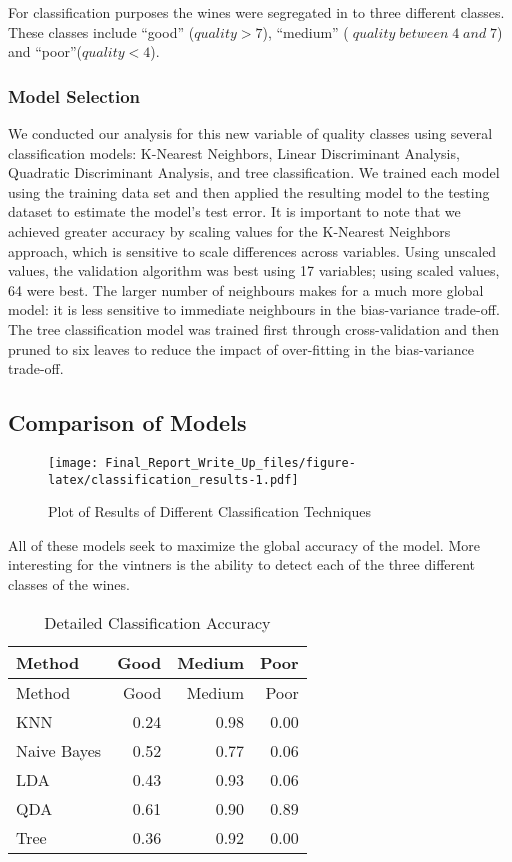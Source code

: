 \documentclass[]{article}
\begin{document}
For classification purposes the wines were segregated in to three
different classes. These classes include ``good'' (\(quality >7\)),
``medium'' (\(\; quality \; between \; 4 \;and\; 7\)) and
``poor''(\(quality < 4\)).

\subsubsection{Model Selection}\label{model-selection-1}

We conducted our analysis for this new variable of quality classes using
several classification models: K-Nearest Neighbors, Linear Discriminant
Analysis, Quadratic Discriminant Analysis, and tree classification. We
trained each model using the training data set and then applied the
resulting model to the testing dataset to estimate the model's test
error. It is important to note that we achieved greater accuracy by
scaling values for the K-Nearest Neighbors approach, which is sensitive
to scale differences across variables. Using unscaled values, the
validation algorithm was best using 17 variables; using scaled values,
64 were best. The larger number of neighbours makes for a much more
global model: it is less sensitive to immediate neighbours in the
bias-variance trade-off. The tree classification model was trained first
through cross-validation and then pruned to six leaves to reduce the
impact of over-fitting in the bias-variance trade-off.

\subsection{Comparison of Models}\label{comparison-of-models}

\begin{figure}[H]
\centering
\texttt{[image: Final\_Report\_Write\_Up\_files/figure-latex/classification\_results-1.pdf]}
\caption{Plot of Results of Different Classification Techniques}
\end{figure}

All of these models seek to maximize the global accuracy of the model.
More interesting for the vintners is the ability to detect each of the
three different classes of the wines.

\begin{longtable}[]{@{}lrrr@{}}
\caption{Detailed Classification Accuracy}\tabularnewline
\toprule
Method & Good & Medium & Poor\tabularnewline
\midrule
\endfirsthead
\toprule
Method & Good & Medium & Poor\tabularnewline
\midrule
\endhead
KNN & 0.24 & 0.98 & 0.00\tabularnewline
Naive Bayes & 0.52 & 0.77 & 0.06\tabularnewline
LDA & 0.43 & 0.93 & 0.06\tabularnewline
QDA & 0.61 & 0.90 & 0.89\tabularnewline
Tree & 0.36 & 0.92 & 0.00\tabularnewline
\bottomrule
\end{longtable}
\end{document}
